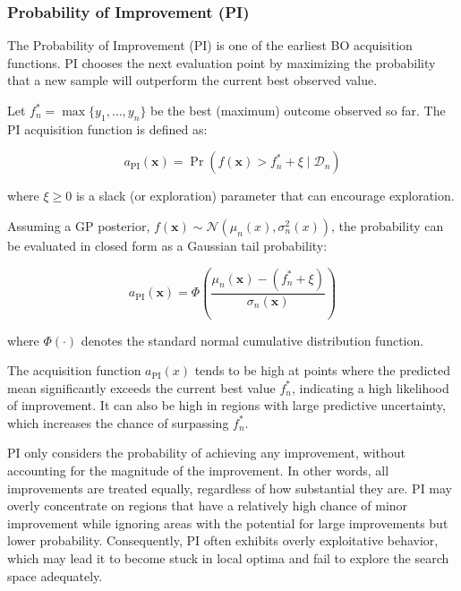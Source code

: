 \documentclass{ut-thesis}
\begin{document}
\subsubsection{Probability of Improvement (PI)}

The Probability of Improvement (PI) is one of the earliest BO acquisition functions\cite{kushner1964new}. PI chooses the next evaluation point by maximizing the probability that a new sample will outperform the current best observed value.

Let $f_n^* = \max \{ y_1, \dots, y_n \}$ be the best (maximum) outcome observed so far. The PI acquisition function is defined as:

\begin{equation}
    a_{\text{PI}}(\mathbf{x}) = \Pr\left( f(\mathbf{x}) > f_n^* + \xi \mid \mathcal{D}_n \right)
\end{equation}

where $\xi \geq 0$ is a slack (or exploration) parameter that can encourage exploration.

Assuming a GP posterior, $f(\mathbf{x}) \sim \mathcal{N}(\mu_n(x), \sigma_n^2(x))$, the probability can be evaluated in closed form as a Gaussian tail probability:

\begin{equation}
    a_{\text{PI}}(\mathbf{x}) = \Phi\left( \frac{\mu_n(\mathbf{x}) - (f_n^* + \xi)}{\sigma_n(\mathbf{x})} \right)
\end{equation}

where $\Phi(\cdot)$ denotes the standard normal cumulative distribution function.

The acquisition function $a_{\text{PI}}(x)$ tends to be high at points where the predicted mean significantly exceeds the current best value $f_n^*$, indicating a high likelihood of improvement. It can also be high in regions with large predictive uncertainty, which increases the chance of surpassing $f_n^*$.

PI only considers the probability of achieving any improvement, without accounting for the magnitude of the improvement. In other words, all improvements are treated equally, regardless of how substantial they are. PI may overly concentrate on regions that have a relatively high chance of minor improvement while ignoring areas with the potential for large improvements but lower probability. Consequently, PI often exhibits overly exploitative behavior, which may lead it to become stuck in local optima and fail to explore the search space adequately.
\end{document}
